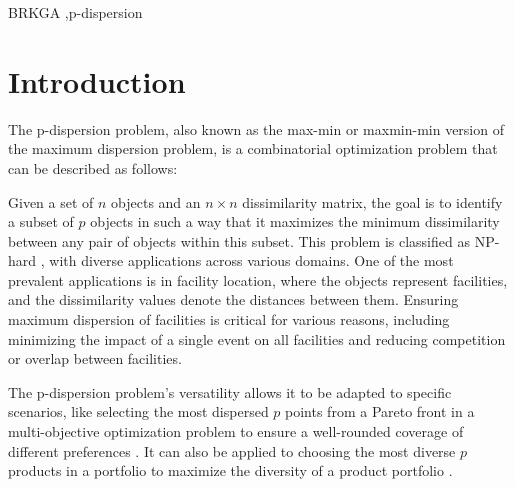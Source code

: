 \documentclass[preprint,12pt]{elsarticle}
\begin{document}
\begin{frontmatter}


\begin{keyword}
BRKGA \sep p-dispersion
\end{keyword}

\end{frontmatter}


\section{Introduction}
\label{sec:intro}

The p-dispersion problem, also known as the max-min or maxmin-min version of the maximum dispersion problem, is a combinatorial optimization problem that can be described as follows:

Given a set of $n$ objects and an $n \times n$ dissimilarity matrix, the goal is to identify a subset of $p$ objects in such a way that it maximizes the minimum dissimilarity between any pair of objects within this subset. This problem is classified as NP-hard \cite{Erkut1990-mo}, with diverse applications across various domains. One of the most prevalent applications is in facility location, where the objects represent facilities, and the dissimilarity values denote the distances between them. Ensuring maximum dispersion of facilities is critical for various reasons, including minimizing the impact of a single event on all facilities and reducing competition or overlap between facilities.

The p-dispersion problem's versatility allows it to be adapted to specific scenarios, like selecting the most dispersed $p$ points from a Pareto front in a multi-objective optimization problem to ensure a well-rounded coverage of different preferences \cite{Dupin2023-vx}. It can also be applied to choosing the most diverse $p$ products in a portfolio to maximize the diversity of a product portfolio \cite{Erkut1990-mo}.
\end{document}
